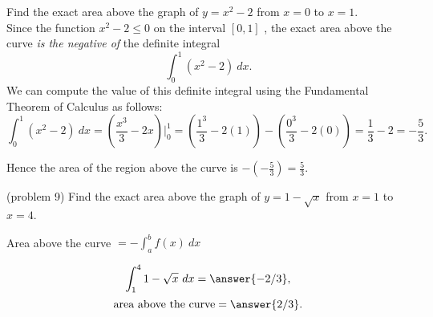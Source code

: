 \documentclass[handout]{ximera}
\begin{document}
\begin{example}[example 9]
Find the exact area above the graph of $y = x^2 - 2$ from $x = 0$ to $x = 1$. \\
Since the function $x^2 - 2 \leq 0$  on the interval $[0,1]$ , the exact area above the curve \textit{is the negative of} the definite integral 
\[\int_0^1 (x^2 -2) \ dx.\]
We can compute the value of this definite integral using the Fundamental Theorem of Calculus as follows:
\[\int_0^1 (x^2 -2) \ dx = \left(\frac{x^3}{3}-2x\right) \Bigg|_{0}^1 = \left(\frac{1^3}{3}-2(1)\right) - \left(\frac{0^3}{3}- 2(0)\right) = \frac13 - 2 =-\frac53.\]

Hence the area of the region above the curve is $-\left(-\frac53\right) = \frac53$.

\begin{image}
\end{image}
\end{example}


\begin{problem}(problem 9)
Find the exact area above the graph of $y = 1 - \sqrt x$ from $x = 1$ to $x = 4$. \\
\begin{hint}
Area above the curve $= -\int_a^b f(x) \ dx$
\end{hint}
\[\int_1^4 1 - \sqrt x \ dx = \answer{-2/3},\]
\[\text{area above the curve} = \answer{2/3}.\]
\end{problem}
\end{document}
